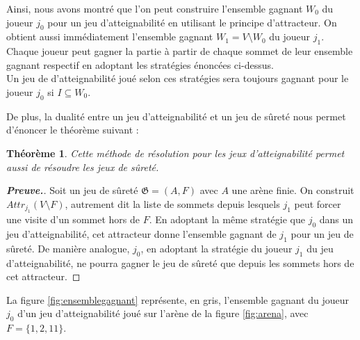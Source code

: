 \documentclass[12pt,a4paper,oneside,titlepage]{report}
\newtheorem{thm}{Th\'eor\`eme}[section]
\newenvironment{demonstration}{\begin{proof}[\textnormal{\textbf{Preuve.}}]}{\end{proof}}
\begin{document}
Ainsi, nous avons montré que l'on peut construire l'ensemble gagnant $W_0$ du joueur $j_0$ pour un jeu d'atteignabilité en utilisant le principe d'attracteur. On obtient aussi immédiatement l'ensemble gagnant $W_1=V\setminus W_0$ du joueur $j_1$. Chaque joueur peut gagner la partie à partir de chaque sommet de leur ensemble gagnant respectif en adoptant les stratégies énoncées ci-dessus.\\
Un jeu de d'atteignabilité joué selon ces stratégies sera toujours gagnant pour le joueur $j_0$ si $I\subseteq W_0$.

\noindent De plus, la dualité entre un jeu d'atteignabilité et un jeu de sûreté nous permet d'énoncer le théorème suivant :

\begin{thm}
	Cette méthode de résolution pour les jeux d'atteignabilité permet aussi de résoudre les jeux de sûreté.
\label{thm:dualite}
\end{thm}
\begin{demonstration}
Soit un jeu de sûreté $\mathfrak{G} = (A, F)$ avec $A$ une arène finie. On construit $Attr_{j_1}(V\setminus F)$, autrement dit la liste de sommets depuis lesquels $j_1$ peut forcer une visite d'un sommet hors de $F$. En adoptant la même stratégie que $j_0$ dans un jeu d'atteignabilité, cet attracteur donne l'ensemble gagnant de $j_1$ pour un jeu de sûreté. De manière analogue, $j_0$, en adoptant la stratégie du joueur $j_1$ du jeu d'atteignabilité, ne pourra gagner le jeu de sûreté que depuis les sommets hors de cet attracteur.
\end{demonstration}
\noindent La figure \ref{fig:ensemblegagnant} représente, en gris, l'ensemble gagnant du joueur $j_0$ d'un jeu d'atteignabilité joué sur l'arène de la figure \ref{fig:arena}, avec $F=\{1,2,11\}$.
\end{document}
